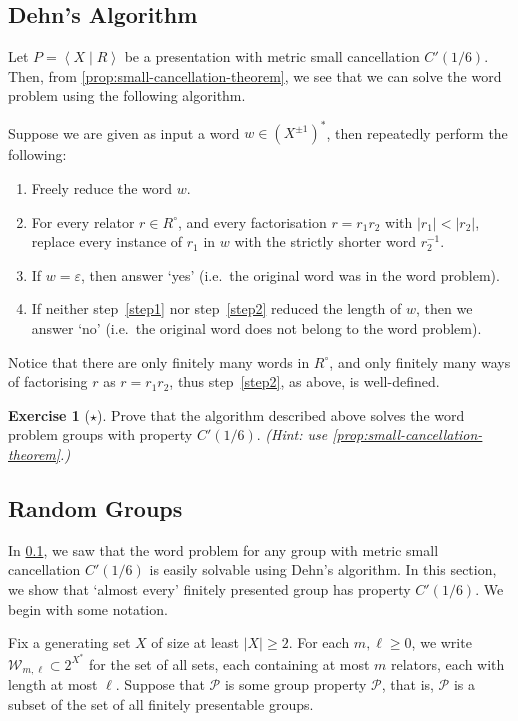 \documentclass[11pt,a4paper,reqno]{amsart}
\theoremstyle{plain}
\theoremstyle{definition}
\theoremstyle{definition}
\newtheorem{exercise}[theorem]{Exercise}
\renewcommand\geq\geqslant
\newcommand\exerciseLevelEasy{$\star$}
\begin{document}
\subsection{Dehn's Algorithm}\label{sec:dehn-algo}

Let $P = \left\langle X \mid R \right\rangle$ be a presentation with metric small cancellation $C'(1/6)$.
Then, from \cref{prop:small-cancellation-theorem}, we see that we can solve the word problem using the following algorithm.

Suppose we are given as input a word $w\in (X^{\pm 1})^*$, then repeatedly perform the following:
\begin{enumerate}
  \item\label{step1} Freely reduce the word $w$.
  \item\label{step2} For every relator $r \in R^\circ$, and every factorisation $r = r_1 r_2$ with $|r_1|< |r_2|$, replace every instance of $r_1$ in $w$ with the strictly shorter word $r_2^{-1}$.
  \item If $w = \varepsilon$, then answer `yes' (i.e.~the original word was in the word problem).
  \item If neither step~\ref{step1} nor step~\ref{step2} reduced the length of $w$, then we answer `no' (i.e.~the original word does not belong to the word problem).
\end{enumerate}
Notice that there are only finitely many words in $R^\circ$, and only finitely many ways of factorising $r$ as $r = r_1 r_2$, thus step~\ref{step2}, as above, is well-defined.

\begin{exercise}[\exerciseLevelEasy]
  Prove that the algorithm described above solves the word problem groups with property $C'(1/6)$.
\textit{(Hint: use \cref{prop:small-cancellation-theorem}.)}
\end{exercise}

\subsection{Random Groups}

In \cref{sec:dehn-algo}, we saw that the word problem for any group with metric small cancellation $C'(1/6)$ is easily solvable using Dehn's algorithm.
In this section, we show that `almost every' finitely presented group has property $C'(1/6)$.
We begin with some notation.

Fix a generating set $X$ of size at least $|X|\geq 2$.
For each $m,\ell\geq 0$, we write $\mathcal W_{m,\ell}\subset 2^{X^*}$ for the set of all sets, each containing at most $m$ relators, each with length at most $\ell$.
Suppose that $\mathcal P$ is some group property $\mathcal P$, that is, $\mathcal P$ is a subset of the set of all finitely presentable groups.
\end{document}
